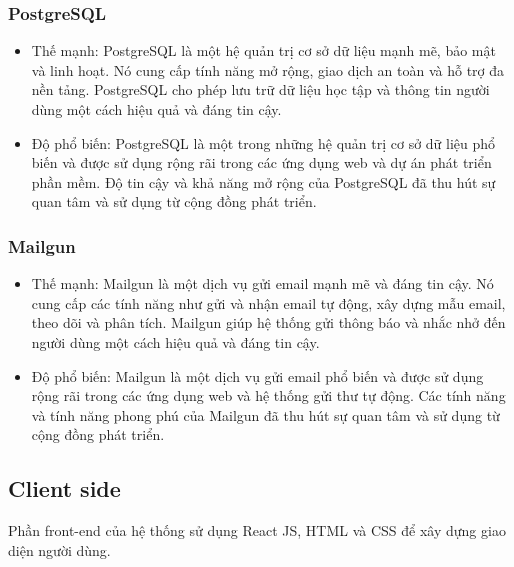 \documentclass[../Thesis.tex]{subfiles}
\begin{document}
		\subsubsection{PostgreSQL}
			\begin{itemize}
				\item Thế mạnh: PostgreSQL là một hệ quản trị cơ sở dữ liệu mạnh mẽ, bảo mật và linh hoạt. Nó cung cấp tính năng mở rộng, giao dịch an toàn và hỗ trợ đa nền tảng. PostgreSQL cho phép lưu trữ dữ liệu học tập và thông tin người dùng một cách hiệu quả và đáng tin cậy.
				\item Độ phổ biến: PostgreSQL là một trong những hệ quản trị cơ sở dữ liệu phổ biến và được sử dụng rộng rãi trong các ứng dụng web và dự án phát triển phần mềm. Độ tin cậy và khả năng mở rộng của PostgreSQL đã thu hút sự quan tâm và sử dụng từ cộng đồng phát triển.
			\end{itemize}

		\subsubsection{Mailgun}
			\begin{itemize}
				\item Thế mạnh: Mailgun là một dịch vụ gửi email mạnh mẽ và đáng tin cậy. Nó cung cấp các tính năng như gửi và nhận email tự động, xây dựng mẫu email, theo dõi và phân tích. Mailgun giúp hệ thống gửi thông báo và nhắc nhở đến người dùng một cách hiệu quả và đáng tin cậy.
				\item Độ phổ biến: Mailgun là một dịch vụ gửi email phổ biến và được sử dụng rộng rãi trong các ứng dụng web và hệ thống gửi thư tự động. Các tính năng và tính năng phong phú của Mailgun đã thu hút sự quan tâm và sử dụng từ cộng đồng phát triển.
			\end{itemize}

	\subsection{Client side}
		Phần front-end của hệ thống sử dụng React JS, HTML và CSS để xây dựng giao diện người dùng. 
\end{document}
